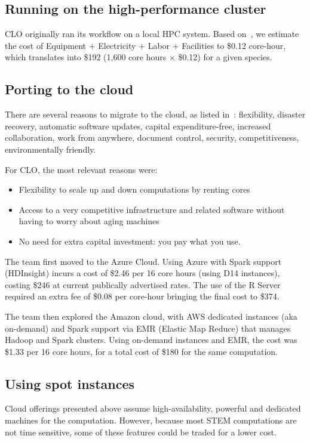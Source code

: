 \documentclass{acm_proc_article-sp}
\begin{document}
\subsection{Running on the high-performance cluster}
CLO originally ran its workflow on a local HPC system. Based on~\cite{Spagnuolo_undated-ih}, we estimate the cost of Equipment + Electricity + Labor + Facilities to \$0.12 core-hour, which translates into \$192 (1,600 core hours $\times$ \$0.12) for a given species.

\subsection{Porting to the cloud}
There are several reasons to migrate to the cloud, as listed in~\cite{noauthor_undated-ne}: flexibility, disaster recovery, automatic software updates, capital expenditure-free, increased collaboration, work from anywhere, document control, security, competitiveness, environmentally friendly.

For CLO, the most relevant reasons were:
\begin{itemize}[noitemsep, topsep=-5pt]
\item Flexibility to scale up and down computations by renting cores 
\item Access to a very competitive infrastructure and related software without having to worry about aging machines
\item No need for extra capital investment: you pay what you use.
\end{itemize}

The team first moved to the Azure Cloud. Using Azure with Spark support (HDInsight) incurs a cost of \$2.46 per 16 core hours (using D14 instances), costing \$246 at current publically advertised rates. The use of the R Server required an extra fee of \$0.08 per core-hour bringing the final cost to \$374.

The team then explored the Amazon cloud, with AWS dedicated instances (aka on-demand) and Spark support via EMR (Elastic Map Reduce) that manages Hadoop and Spark clusters. Using on-demand instances and EMR, the cost was  \$1.33 per 16 core hours, for a total cost of  \$180 for the same computation.

\subsection{Using spot instances}
Cloud offerings presented above assume high-availability, powerful and dedicated machines for the computation. However, because most STEM computations are not time sensitive, some of these features could be traded for a lower cost.
\end{document}
